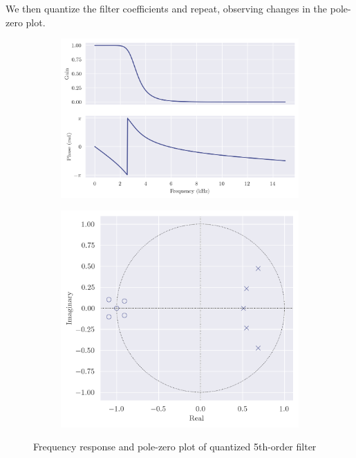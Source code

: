 We then quantize the filter coefficients and repeat, observing changes in the pole-zero plot.

\begin{figure}[!ht]
    \centering
    \begin{subfigure}[b]{0.58\textwidth}
        \centering
        \includegraphics[width=\textwidth]{images/q8_q5th_freqz.png}
    \end{subfigure}
    \hfill
    \begin{subfigure}[b]{0.41\textwidth}
        \centering
        \includegraphics[width=\textwidth]{images/q8_q5th_zp.png}
    \end{subfigure}
    \caption{Frequency response and pole-zero plot of quantized 5th-order filter}
\end{figure}

